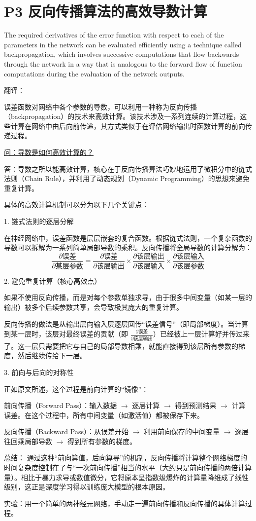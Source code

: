 \documentclass{article}
\begin{document}
\section{P3 反向传播算法的高效导数计算}

The required derivatives of the error function with respect to each of the parameters in the network can be evaluated efficiently using a technique called backpropagation, which involves successive computations that flow backwards through the network in a way that is analogous to the forward flow of function computations during the evaluation of the network outputs.

{\color{red}
翻译：

误差函数对网络中各个参数的导数，可以利用一种称为反向传播（backpropagation）的技术来高效计算。该技术涉及一系列连续的计算过程，这些计算在网络中由后向前传递，其方式类似于在评估网络输出时函数计算的前向传递过程。
}

{\color{blue}
\underline{问：导数是如何高效计算的？}

答：导数之所以能高效计算，核心在于反向传播算法巧妙地运用了微积分中的链式法则（Chain Rule），并利用了动态规划（Dynamic Programming）的思想来避免重复计算。

具体的高效计算机制可以分为以下几个关键点：

1. 链式法则的逐层分解

在神经网络中，误差函数是层层嵌套的复合函数。根据链式法则，一个复杂函数的导数可以拆解为一系列简单局部导数的乘积。反向传播将全局导数的计算分解为：
$$\frac{\partial \text{误差}}{\partial \text{某层参数}} = \frac{\partial \text{误差}}{\partial \text{该层输出}} \times \frac{\partial \text{该层输出}}{\partial \text{该层输入}} \times \frac{\partial \text{该层输入}}{\partial \text{该层参数}}$$

2. 避免重复计算（核心高效点）

如果不使用反向传播，而是对每个参数单独求导，由于很多中间变量（如某一层的输出）被多个后续参数共享，会导致极其庞大的重复计算。

反向传播的做法是从输出层向输入层逐层回传“误差信号”（即局部梯度）。当计算到某一层时，该层对最终误差的贡献（即 $\frac{\partial \text{误差}}{\partial \text{该层输出}}$）已经被上一层计算好并传过来了。这一层只需要把它与自己的局部导数相乘，就能直接得到该层所有参数的梯度，然后继续传给下一层。

3. 前向与后向的对称性

正如原文所述，这个过程是前向计算的“镜像”：

前向传播（Forward Pass）：输入数据 $\rightarrow$ 逐层计算 $\rightarrow$ 得到预测结果 $\rightarrow$ 计算误差。在这个过程中，所有中间变量（如激活值）都被保存下来。

反向传播（Backward Pass）：从误差开始 $\rightarrow$ 利用前向保存的中间变量 $\rightarrow$ 逐层往回乘局部导数 $\rightarrow$ 得到所有参数的梯度。

总结：
通过这种“前向算值，后向算导”的机制，反向传播将计算整个网络梯度的时间复杂度控制在了与“一次前向传播”相当的水平（大约只是前向传播的两倍计算量）。相比于暴力求导或数值微分，它将原本呈指数级爆炸的计算量降维成了线性级别，这正是深度学习得以训练庞大模型的根本原因。

实验：用一个简单的两神经元网络，手动走一遍前向传播和反向传播的具体计算过程。
}
\end{document}

